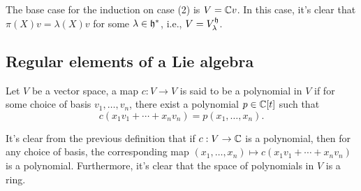 \begin{dang}
    \begin{remark}
        The base case for the induction on case (2) is $V=\mathbb{C} v$. In this case, it's clear that $\pi(X)v=\lambda(X)v$ 
        for some $\lambda\in\mathfrak{h}^*$, i.e., $V=V_\lambda^{\mathfrak{h}}$.
    \end{remark}
\end{dang}


\subsection{Regular elements of a Lie algebra}
 
\begin{dang}
    \begin{definition}
        Let $V$ be a vector space, a map $c:V\to V$ is said to be a polynomial in $V$ if for some choice of basis 
        $v_1,\dots, v_n$, there exist a polynomial $p\in\mathbb{C}[t]$ such that 
        \begin{equation}
            c(x_1v_1 +\cdots+x_nv_n)=p(x_1,\dots,x_n).
        \end{equation}
    \end{definition}
\end{dang}
It's clear from the previous definition that if $c:V\to \mathbb{C}$ is a polynomial, then for any choice of basis, the corresponding map 
$(x_1,\dots,x_n)\mapsto  c(x_1v_1+\cdots+x_nv_n)$ is a polynomial. Furthermore, it's clear that the space of polynomials in $V$
is a ring.

